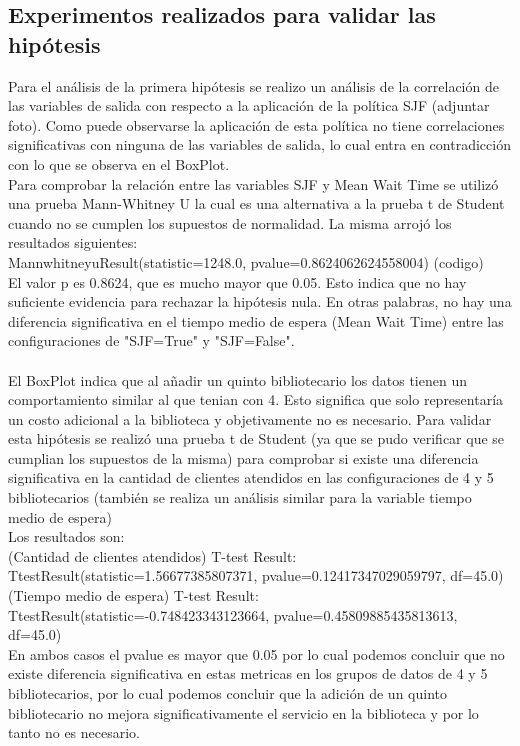 \documentclass[10pt,twocolumn]{article}
\begin{document}
{\subsection{Experimentos realizados para validar las hipótesis}
Para el análisis de la primera hipótesis se realizo un análisis de la correlación de las variables de salida con respecto a la aplicación de la política SJF (adjuntar foto). Como puede observarse la aplicación de esta política no tiene correlaciones significativas con ninguna de las variables de salida, lo cual entra en contradicción con lo que se observa en el BoxPlot. \\
Para comprobar la relación entre las variables SJF y Mean Wait Time se utilizó una prueba  Mann-Whitney U la cual es una alternativa a la prueba t de Student cuando no se cumplen los supuestos de normalidad. La misma arrojó los resultados siguientes:\\
MannwhitneyuResult(statistic=1248.0, pvalue=0.8624062624558004) (codigo)\\
El valor p es 0.8624, que es mucho mayor que 0.05. Esto indica que no hay suficiente evidencia para rechazar la hipótesis nula. En otras palabras, no hay una diferencia significativa en el tiempo medio de espera (Mean Wait Time) entre las configuraciones de "SJF=True" y "SJF=False".\\
\\
El BoxPlot indica que al añadir un quinto bibliotecario los datos tienen un comportamiento similar al que tenian con 4. Esto significa que solo representaría un costo adicional a la biblioteca y objetivamente no es necesario. Para validar esta hipótesis se realizó una prueba t de Student (ya que se pudo verificar que se cumplian los supuestos de la misma) para comprobar si existe una diferencia significativa en la cantidad de clientes atendidos en las configuraciones de 4 y 5 bibliotecarios (también se realiza un análisis similar para la variable tiempo medio de espera)\\
Los resultados son:\\
(Cantidad de clientes atendidos) T-test Result: TtestResult(statistic=1.56677385807371, pvalue=0.12417347029059797, df=45.0)\\
(Tiempo medio de espera) T-test Result: TtestResult(statistic=-0.748423343123664, pvalue=0.45809885435813613, df=45.0)\\
En ambos casos el pvalue es mayor que 0.05 por lo cual podemos concluir que no existe diferencia significativa en estas metricas en los grupos de datos de 4 y 5 bibliotecarios, por lo cual podemos concluir que la adición de un quinto bibliotecario no mejora significativamente el servicio en la biblioteca y por lo tanto no es necesario.




}
\end{document}
